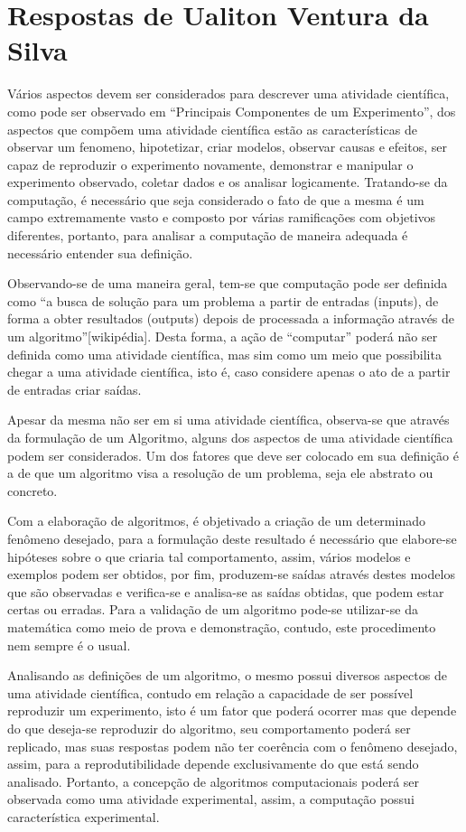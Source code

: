 \section{Respostas de Ualiton Ventura da Silva\label{tarefa-ualiton-ventura-componentes-eperimento}}

Vários aspectos devem ser considerados para descrever uma atividade científica, como pode ser observado em “Principais Componentes de um Experimento”, dos aspectos que compõem uma atividade científica estão as características de observar um \gls{fenomeno}, hipotetizar, criar modelos, observar causas e efeitos, ser capaz de reproduzir o experimento novamente, demonstrar e manipular o experimento observado, coletar dados e os analisar logicamente. Tratando-se da computação, é necessário que seja considerado o fato de que a mesma é um campo extremamente vasto e composto por várias ramificações com objetivos diferentes, portanto, para analisar a computação de maneira adequada é necessário entender sua definição.

Observando-se de uma maneira geral, tem-se que computação pode ser definida como “a busca de solução para um problema a partir de entradas (inputs), de forma a obter resultados (outputs) depois de processada a informação através de um algoritmo”[wikipédia]. Desta forma, a ação de “computar” poderá não ser definida como uma atividade científica, mas sim como um meio que possibilita chegar a uma atividade científica, isto é, caso considere apenas o ato de a partir de entradas criar saídas.

Apesar da mesma não ser em si uma atividade científica, observa-se que através da formulação de um \gls{Algoritmo}, alguns dos aspectos de uma atividade científica podem ser considerados. Um dos fatores que deve ser colocado em sua definição é a de que um algoritmo visa a resolução de um problema, seja ele abstrato ou concreto.

Com a elaboração de algoritmos, é objetivado a criação de um determinado fenômeno desejado, para a formulação deste resultado é necessário que elabore-se hipóteses sobre o que criaria tal comportamento, assim, vários modelos e exemplos podem ser obtidos, por fim, produzem-se saídas através destes modelos que são observadas e verifica-se e analisa-se as saídas obtidas, que podem estar certas ou erradas. Para a validação de um algoritmo pode-se utilizar-se da matemática como meio de prova e demonstração, contudo, este procedimento nem sempre é o usual.
 
Analisando as definições de um algoritmo, o mesmo possui diversos aspectos de uma atividade científica, contudo em relação a capacidade de ser possível reproduzir um experimento, isto é um fator que poderá ocorrer mas que depende do que deseja-se reproduzir do algoritmo, seu comportamento poderá ser replicado, mas suas respostas podem não ter coerência com o fenômeno desejado, assim, para a reprodutibilidade depende exclusivamente do que está sendo analisado. Portanto, a concepção de algoritmos computacionais poderá ser observada como uma atividade experimental, assim, a computação possui característica experimental.

